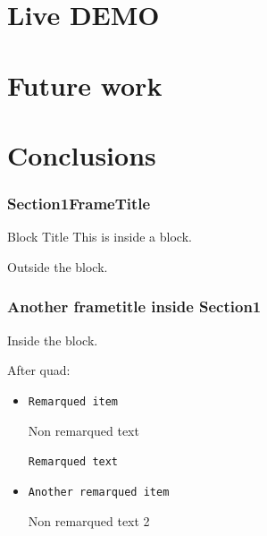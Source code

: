 \documentclass[10pt]{beamer}
\begin{document}
\section {Live DEMO}
\section {Future work}
\section {Conclusions}





\begin{frame}[fragile]
\frametitle{Section1FrameTitle}

\begin{block}{Block Title}
This is inside a block.


\end{block}

Outside the block.

\end{frame}

\begin{frame}
\frametitle{Another frametitle inside Section1}


\begin{block}{}
Inside the block.
\end{block}


\quad


After quad:

\begin{itemize}

\item {\tt Remarqued item}

Non remarqued text

{\tt Remarqued text} 

 \item {\tt Another remarqued item}

Non remarqued text 2 

\end{itemize}

\end{frame}
\end{document}
